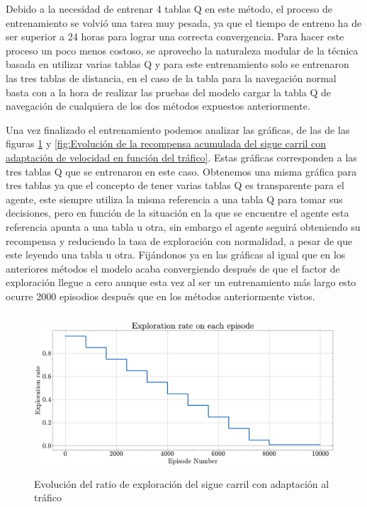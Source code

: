 \bigskip

Debido a la necesidad de entrenar 4 tablas Q en este método, el proceso de entrenamiento se volvió una tarea muy pesada, ya que el tiempo de entreno ha de ser superior a 24 horas para lograr una correcta convergencia. Para hacer este proceso un poco menos costoso, se aprovecho la naturaleza modular de la técnica basada en utilizar varias tablas Q y para este entrenamiento solo se entrenaron las tres tablas de distancia, en el caso de la tabla para la navegación normal basta con a la hora de realizar las pruebas del modelo cargar la tabla Q de navegación de cualquiera de los dos métodos expuestos anteriormente.

\bigskip
Una vez finalizado el entrenamiento podemos analizar las gráficas, de  las de las figuras \ref{fig:Evolución del ratio de exploración del sigue carril con adaptación de velocidad en función del tráfico} y \ref{fig:Evolución de la recompensa acumulada del sigue carril con adaptación de velocidad en función del tráfico}. Estas gráficas corresponden a las tres tablas Q que se entrenaron en este caso. Obtenemos una misma gráfica para tres tablas ya que el concepto de tener varias tablas Q es transparente para el agente, este siempre utiliza la misma referencia a una tabla Q para tomar sus decisiones, pero en función de la situación en la que se encuentre el agente esta referencia apunta a una tabla u otra, sin embargo el agente seguirá obteniendo su recompensa y reduciendo la tasa de exploración con normalidad, a pesar de que este leyendo una tabla u otra. Fijándonos ya en las gráficas al igual que en los anteriores métodos el modelo acaba convergiendo después de que el factor de exploración llegue a cero aunque esta vez al ser un entrenamiento más largo esto ocurre 2000 episodios después que en los métodos anteriormente vistos.

\bigskip

  \begin{figure}[h]
    \centering
    \includegraphics[height=6cm]{imagenes/cap4/adaptacion_trafico_qlearning/exploration_rate.pdf}
    \caption{Evolución del ratio de exploración del sigue carril con adaptación al tráfico}
    \label{fig:Evolución del ratio de exploración del sigue carril con adaptación de velocidad en función del tráfico}
\end{figure}
        
